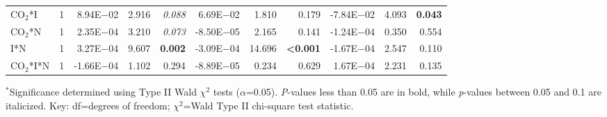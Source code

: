 \begin{landscape}
\begin{table}
{\begin{tabular}{p{3cm}p{0.5cm}p{1.75cm}p{1.5cm}p{1.5cm}p{1.75cm}p{1.5cm}p{1.5cm}p{1.75cm}p{1.5cm}p{1.5cm}}
            CO$_2$*I & \multicolumn{1}{r}{1}
            & \multicolumn{1}{r}{ 8.94E$-$02}     & \multicolumn{1}{r}{2.916}         & \multicolumn{1}{r}{\textit{0.088}}
            & \multicolumn{1}{r}{ 6.69E$-$02}     & \multicolumn{1}{r}{1.810}         & \multicolumn{1}{r}{0.179}
            & \multicolumn{1}{r}{-7.84E$-$02}     & \multicolumn{1}{r}{4.093}         & \multicolumn{1}{r}{\textbf{0.043}} 
            \\

            CO$_2$*N & \multicolumn{1}{r}{1}
            & \multicolumn{1}{r}{ 2.35E$-$04}     & \multicolumn{1}{r}{3.210}         & \multicolumn{1}{r}{\textit{0.073}}
            & \multicolumn{1}{r}{-8.50E$-$05}     & \multicolumn{1}{r}{2.165}         & \multicolumn{1}{r}{0.141}
            & \multicolumn{1}{r}{-1.24E$-$04}     & \multicolumn{1}{r}{0.350}         & \multicolumn{1}{r}{0.554} 
            \\

            I*N & \multicolumn{1}{r}{1}
            & \multicolumn{1}{r}{ 3.27E$-$04}     & \multicolumn{1}{r}{9.607}         & \multicolumn{1}{r}{\textbf{0.002}}
            & \multicolumn{1}{r}{-3.09E$-$04}     & \multicolumn{1}{r}{14.696}        & \multicolumn{1}{r}{\textbf{<0.001}}
            & \multicolumn{1}{r}{-1.67E$-$04}     & \multicolumn{1}{r}{2.547}         & \multicolumn{1}{r}{0.110} 
            \\

            CO$_2$*I*N & \multicolumn{1}{r}{1}
            & \multicolumn{1}{r}{-1.66E$-$04}     & \multicolumn{1}{r}{1.102}         & \multicolumn{1}{r}{0.294}
            & \multicolumn{1}{r}{-8.89E$-$05}     & \multicolumn{1}{r}{0.234}         & \multicolumn{1}{r}{0.629}
            & \multicolumn{1}{r}{ 1.67E$-$04}     & \multicolumn{1}{r}{2.231}         & \multicolumn{1}{r}{0.135} 
            \\
            \hline
    \end{tabular}}
    \label{tab:table5.2}
    \end{table}
\begin{singlespace}
\noindent $^*$Significance determined using Type II Wald $\chi^2$ tests ($\alpha$=0.05). \textit{P}-values less than 0.05 are in bold, while \textit{p}-values between 0.05 and 0.1 are italicized. Key: df=degrees of freedom; $\chi^2$=Wald Type II chi-square test statistic.
\end{singlespace}
\end{landscape}
\clearpage

